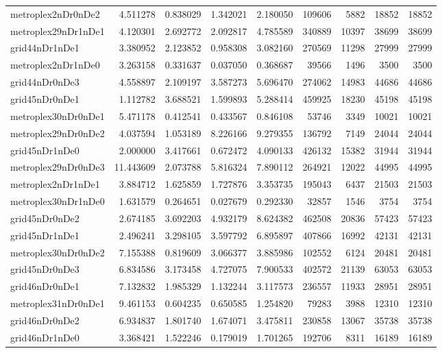 \begin{longtable}{|l|r|r|r|r|r|r|r|r|}
metroplex2nDr0nDe2 & 4.511278 & 0.838029 & 1.342021 & 2.180050 & 109606 & 5882 & 18852 & 18852 \\
metroplex29nDr1nDe1 & 4.120301 & 2.692772 & 2.092817 & 4.785589 & 340889 & 10397 & 38699 & 38699 \\
grid44nDr1nDe1 & 3.380952 & 2.123852 & 0.958308 & 3.082160 & 270569 & 11298 & 27999 & 27999 \\
metroplex2nDr1nDe0 & 3.263158 & 0.331637 & 0.037050 & 0.368687 & 39566 & 1496 & 3500 & 3500 \\
grid44nDr0nDe3 & 4.558897 & 2.109197 & 3.587273 & 5.696470 & 274062 & 14983 & 44686 & 44686 \\
grid45nDr0nDe1 & 1.112782 & 3.688521 & 1.599893 & 5.288414 & 459925 & 18230 & 45198 & 45198 \\
metroplex30nDr0nDe1 & 5.471178 & 0.412541 & 0.433567 & 0.846108 & 53746 & 3349 & 10021 & 10021 \\
metroplex29nDr0nDe2 & 4.037594 & 1.053189 & 8.226166 & 9.279355 & 136792 & 7149 & 24044 & 24044 \\
grid45nDr1nDe0 & 2.000000 & 3.417661 & 0.672472 & 4.090133 & 426132 & 15382 & 31944 & 31944 \\
metroplex29nDr0nDe3 & 11.443609 & 2.073788 & 5.816324 & 7.890112 & 264921 & 12022 & 44995 & 44995 \\
metroplex2nDr1nDe1 & 3.884712 & 1.625859 & 1.727876 & 3.353735 & 195043 & 6437 & 21503 & 21503 \\
metroplex30nDr1nDe0 & 1.631579 & 0.264651 & 0.027679 & 0.292330 & 32857 & 1546 & 3754 & 3754 \\
grid45nDr0nDe2 & 2.674185 & 3.692203 & 4.932179 & 8.624382 & 462508 & 20836 & 57423 & 57423 \\
grid45nDr1nDe1 & 2.496241 & 3.298105 & 3.597792 & 6.895897 & 407866 & 16992 & 42131 & 42131 \\
metroplex30nDr0nDe2 & 7.155388 & 0.819609 & 3.066377 & 3.885986 & 102552 & 6124 & 20481 & 20481 \\
grid45nDr0nDe3 & 6.834586 & 3.173458 & 4.727075 & 7.900533 & 402572 & 21139 & 63053 & 63053 \\
grid46nDr0nDe1 & 7.132832 & 1.985329 & 1.132244 & 3.117573 & 236557 & 11933 & 28951 & 28951 \\
metroplex31nDr0nDe1 & 9.461153 & 0.604235 & 0.650585 & 1.254820 & 79283 & 3988 & 12310 & 12310 \\
grid46nDr0nDe2 & 6.934837 & 1.801740 & 1.674071 & 3.475811 & 230858 & 13067 & 35738 & 35738 \\
grid46nDr1nDe0 & 3.368421 & 1.522246 & 0.179019 & 1.701265 & 192706 & 8311 & 16189 & 16189 \\

\end{longtable}
